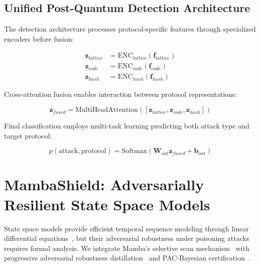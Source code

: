 \subsection{Unified Post-Quantum Detection Architecture}

The detection architecture processes protocol-specific features through specialized encoders before fusion:

\begin{align}
\mathbf{z}_{lattice} &= \text{ENC}_{lattice}(\mathbf{f}_{lattice}) \\
\mathbf{z}_{code} &= \text{ENC}_{code}(\mathbf{f}_{code}) \\
\mathbf{z}_{hash} &= \text{ENC}_{hash}(\mathbf{f}_{hash})
\end{align}

Cross-attention fusion enables interaction between protocol representations:

\begin{equation}
\mathbf{z}_{fused} = \text{MultiHeadAttention}([\mathbf{z}_{lattice}, \mathbf{z}_{code}, \mathbf{z}_{hash}])
\end{equation}

Final classification employs multi-task learning predicting both attack type and target protocol:

\begin{equation}
p(\text{attack}, \text{protocol}) = \text{Softmax}(\mathbf{W}_{out} \mathbf{z}_{fused} + \mathbf{b}_{out})
\end{equation}

\section{MambaShield: Adversarially Resilient State Space Models}
\label{sec:models_mambashield}

State space models provide efficient temporal sequence modeling through linear differential equations~\cite{gu2022efficiently}, but their adversarial robustness under poisoning attacks~\cite{biggio2012poisoning} requires formal analysis. We integrate Mamba's selective scan mechanism~\cite{gu2024mamba} with progressive adversarial robustness distillation~\cite{papernot2016distillation} and PAC-Bayesian certification~\cite{mcallester2003pac,dziugaite2017computing}.



